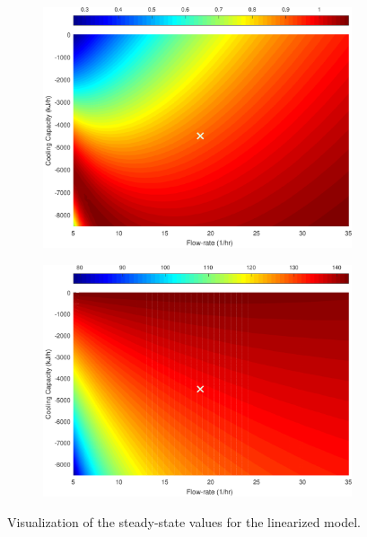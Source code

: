 \documentclass[a4paper,11pt]{book}
\numberwithin{figure}{chapter}
\numberwithin{equation}{chapter}
\numberwithin{table}{chapter}
\theoremstyle{definition}
\begin{document}
\begin{figure}[ht] \centering
	\begin{subfigure}{0.45\textwidth}
		\includegraphics[width=\textwidth]{chapter7/ssValues01}
	\end{subfigure} \hfill
	\begin{subfigure}{0.45\textwidth}
		\includegraphics[width=\textwidth]{chapter7/ssValues02}
	\end{subfigure}
	
	\caption{Visualization of the steady-state values for the linearized model.}
	\label{fig:ssValues}
\end{figure}
\end{document}
